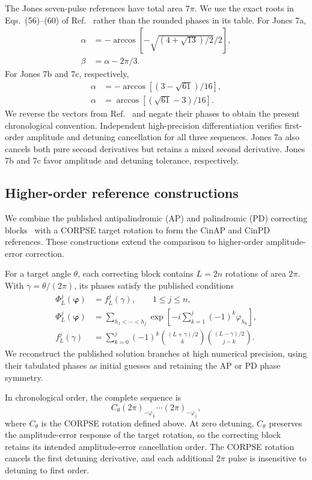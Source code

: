 \documentclass[10pt,aps,twocolumn,pra,floatfix,superscriptaddress]{revtex4-2}
\begin{document}
The Jones seven-pulse references have total area $7\pi$. We use the
exact roots in Eqs.~(56)--(60) of Ref.~\cite{Jones_2013_NOT}
rather than the rounded phases in its table. For Jones 7a,
\begin{align*}
\alpha&=-\arccos[-\sqrt{(4+\sqrt{13})/2}/2],\\
\beta&=\alpha-2\pi/3.
\end{align*}
For Jones 7b and 7c, respectively,
\begin{align*}
\alpha&=-\arccos[(3-\sqrt{61})/16],\\
\alpha&=\arccos[(\sqrt{61}-3)/16].
\end{align*}
We reverse the vectors from Ref.~\cite{Jones_2013_NOT} and negate their phases to obtain the
present chronological convention. Independent high-precision
differentiation verifies first-order amplitude and detuning
cancellation for all three sequences. Jones 7a also cancels both pure
second derivatives but retains a mixed second derivative. Jones 7b
and 7c favor amplitude and detuning tolerance, respectively.

\subsection{Higher-order reference constructions}

We combine the published antipalindromic (AP) and palindromic (PD)
correcting blocks~\cite{arbitraryCp} with a CORPSE target rotation
to form the CinAP and CinPD references. These constructions extend
the comparison to higher-order amplitude-error correction.

For a target angle $\theta$, each correcting block contains $L=2n$
rotations of area $2\pi$. With $\gamma=\theta/(2\pi)$, its phases
satisfy the published conditions
\begin{align}
\Phi_L^j(\boldsymbol\varphi)&=f_L^j(\gamma),
\qquad 1\leq j\leq n,\\
\Phi_L^j(\boldsymbol\varphi)
&=\sum_{h_1<\cdots<h_j}
\exp\!\left[-i\sum_{k=1}^{j}(-1)^k\varphi_{h_k}\right],\\
f_L^j(\gamma)
&=\sum_{k=0}^{j}(-1)^k
\binom{(L+\gamma)/2}{k}
\binom{(L-\gamma)/2}{j-k}.
\end{align}
We reconstruct the published solution branches at high numerical
precision, using their tabulated phases as initial guesses and
retaining the AP or PD phase symmetry.

In chronological order, the complete sequence is
\begin{equation}
C_\theta(2\pi)_{-\varphi_L}\cdots(2\pi)_{-\varphi_1},
\end{equation}
where $C_\theta$ is the CORPSE rotation defined above. At zero
detuning, $C_\theta$ preserves the amplitude-error response of the
target rotation, so the correcting block retains its intended
amplitude-error cancellation order. The CORPSE rotation cancels the
first detuning derivative, and each additional $2\pi$ pulse is
insensitive to detuning to first order.
\end{document}
